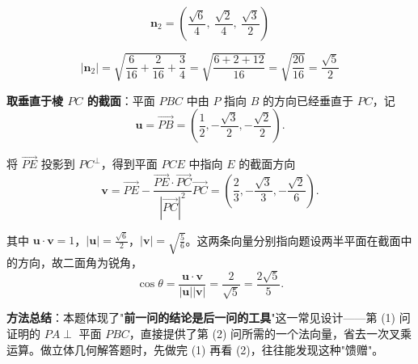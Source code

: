 \begin{answer}
\nopagebreak[4]
\[\boldsymbol n_2=\left(\frac{\sqrt6}4,\ \frac{\sqrt2}4,\ \frac{\sqrt3}2\right)\]

\nopagebreak[4]
\[\left|\boldsymbol n_2\right|=\sqrt{\frac6{16}+\frac2{16}+\frac34}=\sqrt{\frac{6+2+12}{16}}=\sqrt{\frac{20}{16}}=\frac{\sqrt5}2\]

\textbf{取垂直于棱 $PC$ 的截面}：平面 $PBC$ 中由 $P$ 指向 $B$ 的方向已经垂直于 $PC$，记
\nopagebreak[4]
\[\boldsymbol u=\overrightarrow{PB}=\left(\frac12,-\frac{\sqrt3}2,-\frac{\sqrt2}2\right).\]

将 $\overrightarrow{PE}$ 投影到 $PC^\perp$，得到平面 $PCE$ 中指向 $E$ 的截面方向
\nopagebreak[4]
\[\boldsymbol v=\overrightarrow{PE}-\frac{\overrightarrow{PE}\cdot\overrightarrow{PC}}{|\overrightarrow{PC}|^2}\overrightarrow{PC}=\left(\frac23,-\frac{\sqrt3}3,-\frac{\sqrt2}6\right).\]

其中 $\boldsymbol u\cdot\boldsymbol v=1$，$|\boldsymbol u|=\frac{\sqrt6}2$，$|\boldsymbol v|=\sqrt{\frac56}$。这两条向量分别指向题设两半平面在截面中的方向，故二面角为锐角，
\nopagebreak[4]
\[\cos\theta=\frac{\boldsymbol u\cdot\boldsymbol v}{|\boldsymbol u||\boldsymbol v|}=\frac{2}{\sqrt5}=\frac{2\sqrt5}5.\]

\begin{gktip}
\textbf{方法总结}：本题体现了"\textbf{前一问的结论是后一问的工具}"这一常见设计——第 (1) 问证明的 $PA\perp$ 平面 $PBC$，直接提供了第 (2) 问所需的一个法向量，省去一次叉乘运算。做立体几何解答题时，先做完 (1) 再看 (2)，往往能发现这种"馈赠"。
\end{gktip}



\par\medskip

\end{answer}
